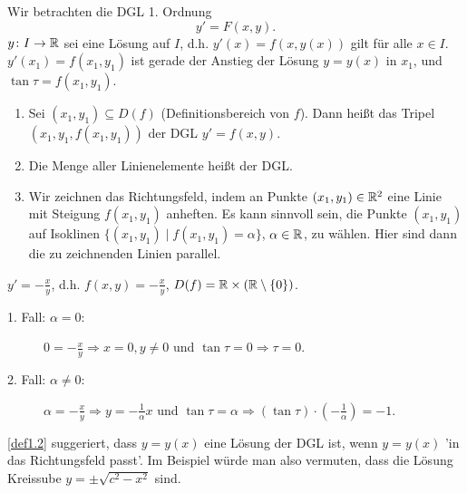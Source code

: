 \begin{definition}
	Wir betrachten die DGL 1. Ordnung
	\[ y'=F(x,y). \]
	$ y\colon I\rightarrow\mathbb{R} $ sei eine L\"osung auf $ I $, d.h. $ y'(x)=f(x,y(x)) $ gilt f\"ur alle $ x\in I $.\\
	$ y'(x_1)=f(x_1,y_1) $ ist gerade der Anstieg der L\"osung $ y=y(x) $ in $ x_1 $, und $ \tan\tau=f(x_1,y_1) $.
	\begin{enumerate}
		\item Sei $ (x_1,y_1)\subseteq D(f) $ (Definitionsbereich von $ f $). Dann hei\ss t das Tripel $ (x_1,y_1,f(x_1,y_1)) $  der DGL $ y'=f(x,y) $.
		\item Die Menge aller Linienelemente hei\ss t  der DGL.
		\item Wir zeichnen das Richtungsfeld, indem an Punkte $ (x_1,y_1)\in\mathbb{R}^2 $ eine Linie mit Steigung $ f(x_1,y_1) $ anheften. Es kann sinnvoll sein, die Punkte $ (x_1,y_1) $ auf Isoklinen $ \lbrace (x_1,y_1)\mid f(x_1,y_1)=\alpha\rbrace $, $ \alpha\in\mathbb{R} $, zu w\"ahlen. Hier sind dann die zu zeichnenden Linien parallel.
	\end{enumerate}
\end{definition}
\begin{beispiel}
	$ y'=-\frac{x}{y} $, d.h. $ f(x,y)=-\frac{x}{y} $, $ D(f)=\mathbb{R}\times(\mathbb{R}\setminus\lbrace 0\rbrace) $.
	\begin{description}
		\item[1. Fall: $ \alpha=0 $:] $ 0=-\frac{x}{y}\Rightarrow x=0, y\neq 0 $ und $ \tan\tau=0\Rightarrow\tau =0 $.
		\item[2. Fall: $ \alpha\neq 0 $:] $ \alpha=-\frac{x}{y}\Rightarrow y=-\frac{1}{\alpha}x $ und $ \tan\tau=\alpha\Rightarrow (\tan\tau)\cdot\left(-\frac{1}{\alpha}\right)=-1 $.
	\end{description}
\end{beispiel}
\begin{bemerkung}
	\ref{def1.2} suggeriert, dass $ y=y(x) $ eine L\"osung der DGL ist, wenn $ y=y(x) $ 'in das Richtungsfeld passt'. Im Beispiel w\"urde man also vermuten, dass die L\"osung Kreissube $ y=\pm\sqrt{c^2-x^2} $ sind.
\end{bemerkung}
